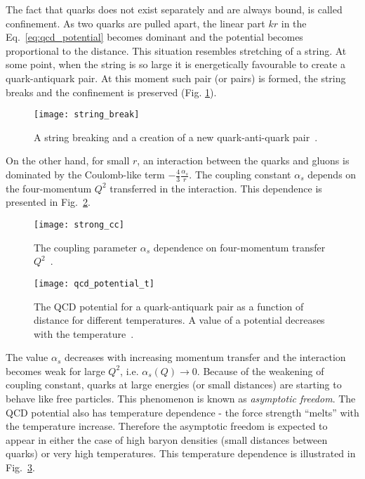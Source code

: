       The fact that quarks does not exist separately and are always bound, is called confinement.
      As two quarks are pulled apart, the linear part $kr$ in the Eq.~\ref{eq:qcd_potential} becomes dominant and the potential becomes proportional to the distance.
      This situation resembles stretching of a string.
      At some point, when the string is so large it is energetically favourable to create a quark-antiquark pair.
      At this moment such pair (or pairs) is formed, the string breaks and the confinement is preserved (Fig. \ref{fig:string_break}).
      \begin{figure}[h]
        \centering
        \texttt{[image: string\_break]}
        \caption{A string breaking and a creation of a new quark-anti-quark pair~\cite{dfck}.}
        \label{fig:string_break}
      \end{figure}
      
      On the other hand, for small $r$, an interaction between the quarks and gluons is dominated by the Coulomb-like term $-\frac{4}{3} \frac{\alpha_s}{r}$.
      The coupling constant $\alpha_s$ depends on the four-momentum $Q^2$ transferred in the interaction.
      This dependence is presented in Fig.~\ref{fig:strong_cc}.
      \begin{figure}[h]
        \centering
        \texttt{[image: strong\_cc]}
        \caption{The coupling parameter $\alpha_s$ dependence on four-momentum transfer~$Q^2$~\cite{pdg}.}
        \label{fig:strong_cc}
      \end{figure}
      \begin{figure}[h]
        \centering
        \texttt{[image: qcd\_potential\_t]}
        \caption{The QCD potential for a quark-antiquark pair as a function of distance for different temperatures. A value of a potential decreases with the temperature~\cite{dfck}.}
        \label{fig:qcd_potential}
      \end{figure}
      The value $\alpha_s$ decreases with increasing momentum transfer and the interaction becomes weak for large $Q^2$, i.e. $\alpha_s (Q) \to 0$.
      Because of the weakening of coupling constant, quarks at large energies (or small distances) are starting to behave like free particles.
      This phenomenon is known as \textit{asymptotic freedom}.      
      The QCD potential also has temperature dependence - the force strength ``melts'' with the temperature increase.
      Therefore the asymptotic freedom is expected to appear in either the case of high baryon densities (small distances between quarks) or very high temperatures.
      This temperature dependence is illustrated in Fig.~\ref{fig:qcd_potential}.
      
